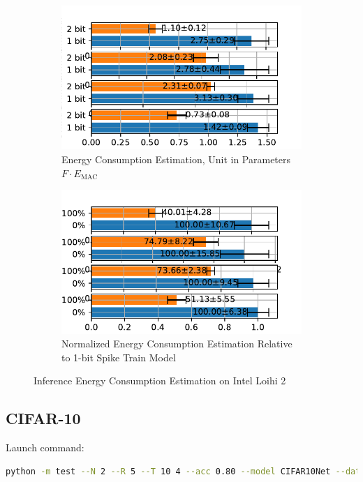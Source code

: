         \begin{figure}[H]
            \centering
            \begin{subfigure}[H]{0.48\textwidth}
                \includegraphics[width=\textwidth]{../timesteps/FashionMNIST/plots/fashionmnist_test_energy_nh.pdf}
                \caption{Energy Consumption Estimation, Unit in Parameters $F\cdot E_{\text{MAC}}$}
            \end{subfigure}
            \hfill
            \begin{subfigure}[H]{0.48\textwidth}
                \includegraphics[width=\textwidth]{../timesteps/FashionMNIST/plots/fashionmnist_test_relative_energy_nh.pdf}
                \caption{Normalized Energy Consumption Estimation Relative to 1-bit Spike Train Model}
            \end{subfigure}
            \caption{Inference Energy Consumption Estimation on Intel Loihi 2}
        \end{figure}

    \subsection{CIFAR-10}
    \label{appendix:energy_tradeoff_cifar10}
        Launch command: 
        \begin{lstlisting}[language=Bash, basicstyle=\small, breaklines=true]
python -m test --N 2 --R 5 --T 10 4 --acc 0.80 --model CIFAR10Net --data-path /scratch/zyi/codeSpace/data --dataset CIFAR10 --batch-size 128 --opt adam --lr 1e-5 --lr-scheduler none --epochs 50 --lr-warmup-epochs 0 --output-dir /scratch/zyi/codeSpace/MultibitSpikes/timesteps
        \end{lstlisting}

